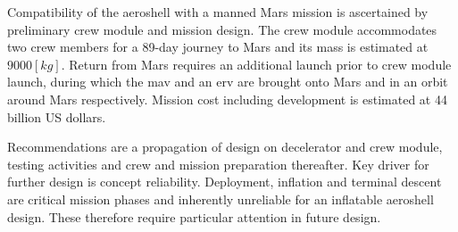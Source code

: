 Compatibility of the aeroshell with a manned Mars mission is ascertained by preliminary crew module and mission design. The crew module accommodates two crew members for a 89-day journey to Mars and its mass is estimated at $9000 \left[ kg \right] $. Return from Mars requires an additional launch prior to crew module launch, during which the \acrlong{mav} and an \acrlong{erv} are brought onto Mars and in an orbit around Mars respectively. Mission cost including development is estimated at 44 billion US dollars.

Recommendations are a propagation of design on decelerator and crew module, testing activities and crew and mission preparation thereafter. Key driver for further design is concept reliability. Deployment, inflation and terminal descent are critical mission phases and inherently unreliable for an inflatable aeroshell design. These therefore require particular attention in future design.


